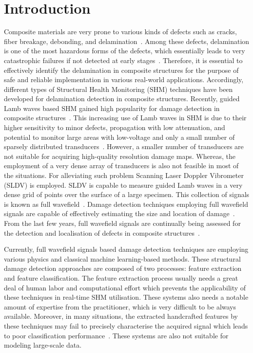 \section{Introduction}
Composite materials are very prone to various kinds of defects such as cracks, fiber breakage, debonding, and delamination~\cite{ip2004delamination, smith2009composite}. Among these defects, delamination is one of the most hazardous forms of the defects, which essentially leads to very catastrophic failures if not detected at early stages~\cite{valdes1999delamination}. Therefore, it is essential to effectively identify the delamination in composite structures for the purpose of safe and reliable implementation in various real-world applications. Accordingly, different types of Structural Health Monitoring (SHM) techniques have been developed for delamination detection in composite structures. Recently, guided Lamb waves based SHM gained high popularity for damage detection in composite structures~\cite{mitra2016guided}. This increasing use of Lamb waves in SHM is due to their higher sensitivity to minor defects, propagation with low attenuation, and potential to monitor large areas with low-voltage and only a small number of sparsely distributed transducers~\cite{alleyne1992interaction, giurgiutiu2003lamb, ihn2008pitch, mitra2016guided}. However, a smaller number of transducers are not suitable for acquiring high-quality resolution damage maps. Whereas, the employment of a very dense array of transducers is also not feasible in most of the situations. For alleviating such problem Scanning Laser Doppler Vibrometer (SLDV) is employed. SLDV is capable to measure guided Lamb waves in a very dense grid of points over the surface of a large specimen. This collection of signals is known as full wavefield~\cite{radzienski2019damage}. Damage detection techniques employing full wavefield signals are capable of effectively estimating the size and location of damage~\cite{girolamo2018impact, kudela2018impact}. From the last few years, full wavefield signals are continually being assessed for the detection and localisation of defects in composite structures~\cite{sohn2011delamination, sohn2011automated, rogge2013characterization, kudela2018impact, radzienski2019damage}.

Currently, full wavefield signals based damage detection techniques are employing various physics and classical machine learning-based methods. These structural damage detection approaches are composed of two processes: feature extraction and feature classification. The feature extraction process usually needs a great deal of human labor and computational effort which prevents the applicability of these techniques in real-time SHM utilisation. These systems also needs a notable amount of expertise from the practitioner, which is very difficult to be always available. Moreover, in many situations, the extracted handcrafted features by these techniques may fail to precisely characterise the acquired signal which leads to poor classification performance~\cite{zhao2019deep, yuan2020machine}. These systems are also not suitable for modeling large-scale data.

